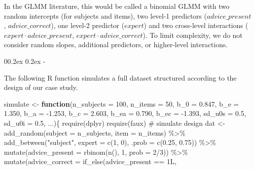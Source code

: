 \documentclass[
  man,
  floatsintext,
  longtable,
  a4paper,
  nolmodern,
  notxfonts,
  notimes,
  colorlinks=true,linkcolor=blue,citecolor=blue,urlcolor=blue]{apa7}
\makeatletter
\renewcommand{\subparagraph}[1]{\@startsection{subparagraph}{5}{0.5em}%
	{0\baselineskip \@plus 0.2ex \@minus 0.2ex}%
	{-\z@\relax}%
	{\normalfont\normalsize\bfseries\itshape\hspace{\parindent}{#1}\textit{\addperi}}{\relax}}
\newenvironment{Shaded}{\begin{snugshade}}{\end{snugshade}}
\newcommand{\AttributeTok}[1]{\textcolor[rgb]{0.40,0.45,0.13}{#1}}
\newcommand{\CommentTok}[1]{\textcolor[rgb]{0.37,0.37,0.37}{#1}}
\newcommand{\ControlFlowTok}[1]{\textcolor[rgb]{0.00,0.23,0.31}{\textbf{#1}}}
\newcommand{\DecValTok}[1]{\textcolor[rgb]{0.68,0.00,0.00}{#1}}
\newcommand{\FloatTok}[1]{\textcolor[rgb]{0.68,0.00,0.00}{#1}}
\newcommand{\FunctionTok}[1]{\textcolor[rgb]{0.28,0.35,0.67}{#1}}
\newcommand{\NormalTok}[1]{\textcolor[rgb]{0.00,0.23,0.31}{#1}}
\newcommand{\OtherTok}[1]{\textcolor[rgb]{0.00,0.23,0.31}{#1}}
\newcommand{\SpecialCharTok}[1]{\textcolor[rgb]{0.37,0.37,0.37}{#1}}
\newcommand{\StringTok}[1]{\textcolor[rgb]{0.13,0.47,0.30}{#1}}
\makeatother
\begin{document}
In the GLMM literature, this would be called a binomial GLMM with two
random intercepts (for subjects and items), two level-1 predictors
(\(advice\_present\), \(advice\_correct\)), one level-2 predictor
(\(expert\)) and two cross-level interactions
(\(expert \cdot advice\_present\), \(expert \cdot advice\_correct\)). To
limit complexity, we do not consider random slopes, additional
predictors, or higher-level interactions.

\subparagraph{Simulation function in R.}\label{simulation-function-in-r}

The following R function simulates a full dataset structured according
to the design of our case study.

\begin{Shaded}
\begin{Highlighting}[]
\NormalTok{simulate }\OtherTok{\textless{}{-}} \ControlFlowTok{function}\NormalTok{(}\AttributeTok{n\_subjects =} \DecValTok{100}\NormalTok{, }\AttributeTok{n\_items =} \DecValTok{50}\NormalTok{,}
  \AttributeTok{b\_0 =} \FloatTok{0.847}\NormalTok{, }\AttributeTok{b\_e =} \FloatTok{1.350}\NormalTok{, }\AttributeTok{b\_a =} \SpecialCharTok{{-}}\FloatTok{1.253}\NormalTok{, }\AttributeTok{b\_c =} \FloatTok{2.603}\NormalTok{,}
  \AttributeTok{b\_ea =} \FloatTok{0.790}\NormalTok{, }\AttributeTok{b\_ec =} \SpecialCharTok{{-}}\FloatTok{1.393}\NormalTok{,}
  \AttributeTok{sd\_u0s =} \FloatTok{0.5}\NormalTok{, }\AttributeTok{sd\_u0i =} \FloatTok{0.5}\NormalTok{, ...)\{}
  \FunctionTok{require}\NormalTok{(dplyr)}
  \FunctionTok{require}\NormalTok{(faux)}
  \CommentTok{\# simulate design}
\NormalTok{  dat }\OtherTok{\textless{}{-}} \FunctionTok{add\_random}\NormalTok{(}\AttributeTok{subject =}\NormalTok{ n\_subjects, }\AttributeTok{item =}\NormalTok{ n\_items) }\SpecialCharTok{\%\textgreater{}\%}
    \FunctionTok{add\_between}\NormalTok{(}\StringTok{"subject"}\NormalTok{, }\AttributeTok{expert =} \FunctionTok{c}\NormalTok{(}\DecValTok{1}\NormalTok{, }\DecValTok{0}\NormalTok{), }\AttributeTok{.prob =} \FunctionTok{c}\NormalTok{(}\FloatTok{0.25}\NormalTok{, }\FloatTok{0.75}\NormalTok{)) }\SpecialCharTok{\%\textgreater{}\%}
    \FunctionTok{mutate}\NormalTok{(}\AttributeTok{advice\_present =} \FunctionTok{rbinom}\NormalTok{(}\FunctionTok{n}\NormalTok{(), }\DecValTok{1}\NormalTok{, }\AttributeTok{prob =} \DecValTok{2}\SpecialCharTok{/}\DecValTok{3}\NormalTok{)) }\SpecialCharTok{\%\textgreater{}\%}
    \FunctionTok{mutate}\NormalTok{(}\AttributeTok{advice\_correct =} \FunctionTok{if\_else}\NormalTok{(advice\_present }\SpecialCharTok{==} \DecValTok{1}\NormalTok{L, }

\end{Highlighting}
\end{Shaded}
\end{document}
